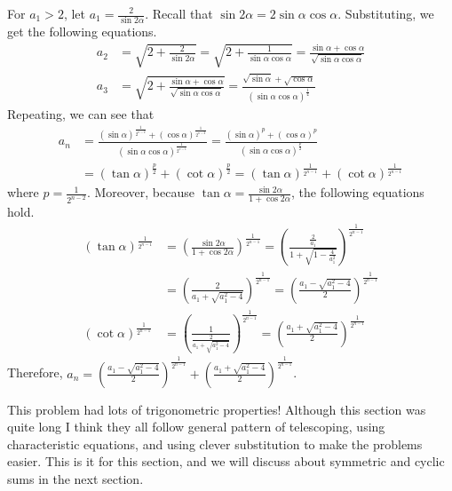 \documentclass[../../../main.tex]{subfiles}
\begin{document}
\begin{solution}
For $a_1 > 2$, let $a_1 = \frac{2}{\sin2\alpha}$. Recall that
$\sin2\alpha = 2\sin\alpha\cos\alpha$. Substituting, we get the
following equations.
\begin{align*}
    a_2
    &= \sqrt{2 + \frac{2}{\sin2\alpha}}
    = \sqrt{2 + \frac{1}{\sin\alpha\cos\alpha}}
    = \frac{\sin\alpha + \cos\alpha}{\sqrt{\sin\alpha\cos\alpha}} \\
    a_3
    &= \sqrt{2 +
        \frac{\sin\alpha + \cos\alpha}{\sqrt{\sin\alpha\cos\alpha}}
    }
    = \frac{
        \sqrt{\sin\alpha} + \sqrt{\cos\alpha}
    }{(\sin\alpha\cos\alpha)^\frac{1}{4}}
\end{align*}
Repeating, we can see that
\begin{align*}
    a_n
    &= \frac{
        (\sin\alpha)^\frac{1}{2^{n-2}} +
        (\cos\alpha)^\frac{1}{2^{n-2}}
    }{ (\sin\alpha\cos\alpha)^\frac{1}{2^{n-1}} }
    = \frac{
        (\sin\alpha)^p +
        (\cos\alpha)^p
    }{ (\sin\alpha\cos\alpha)^\frac{p}{2} } \\
    &= (\tan\alpha)^\frac{p}{2} + (\cot\alpha)^\frac{p}{2}
    = (\tan\alpha)^\frac{1}{2^{n-1}} + (\cot\alpha)^\frac{1}{2^{n-1}}
\end{align*}
where $p = \frac{1}{2^{n-2}}$. Moreover, because $\tan\alpha =
\frac{\sin2\alpha}{1 + \cos2\alpha}$, the following equations hold.
\begin{align*}
    (\tan\alpha)^\frac{1}{2^{n-1}}
    &= \left(
        \frac{\sin2\alpha}{1 + \cos2\alpha}
    \right)^\frac{1}{2^{n-1}}
    = \left(
        \frac{ \frac{2}{a_1} }{ 1 + \sqrt{1 - \frac{4}{a_1^2}} }
    \right)^\frac{1}{2^{n-1}} \\
    &= \left(
        \frac{2}{a_1 + \sqrt{a_1^2 - 4}}
    \right)^\frac{1}{2^{n-1}}
    = \left(
        \frac{a_1 - \sqrt{a_1^2 - 4}}{2}
    \right)^\frac{1}{2^{n-1}} \\
    (\cot\alpha)^\frac{1}{2^{n-1}}
    &= \left(
        \frac{1}{ \frac{2}{a_1 + \sqrt{a_1^2 - 4}} }
    \right)^\frac{1}{2^{n-1}}
    = \left(
        \frac{a_1 + \sqrt{a_1^2 - 4}}{2}
    \right)^\frac{1}{2^{n-1}}
\end{align*}
Therefore, $a_n = \left( \frac{a_1 - \sqrt{a_1^2 - 4}}{2}
\right)^\frac{1}{2^{n-1}} + \left( \frac{a_1 + \sqrt{a_1^2 - 4}}{2}
\right)^\frac{1}{2^{n-1}}$.
\end{solution}

This problem had lots of trigonometric properties! Although this
section was quite long I think they all follow general pattern of
telescoping, using characteristic equations, and using clever
substitution to make the problems easier. This is it for this
section, and we will discuss about symmetric and cyclic sums in
the next section.
\end{document}
